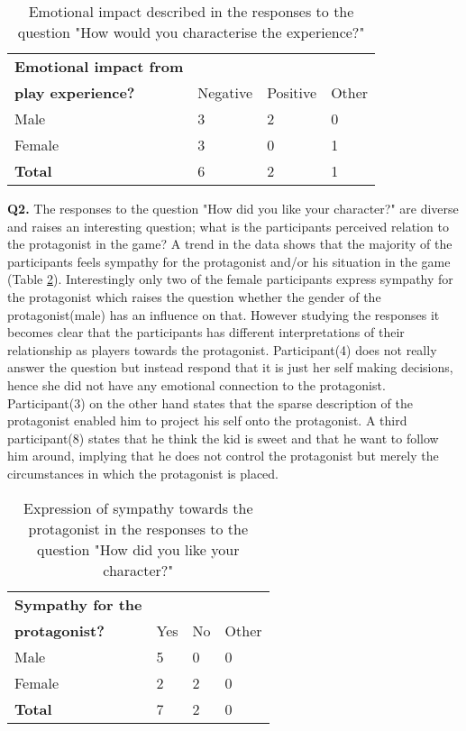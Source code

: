 \begin{table}[h]
\centering
\begin{tabular}{l l l l}
\hline
\textbf{Emotional impact from}\\
\textbf{play experience?} & Negative & Positive & Other \\
\hline
Male & 3 & 2 & 0 \\
Female & 3 & 0 & 1 \\
\textbf{Total} & 6 & 2 & 1 \\
\hline
\end{tabular}
\caption{\label{tab:emo}Emotional impact described in the responses to the question "How would you characterise the experience?"}
\end{table}

\textbf{Q2.} The responses to the question "How did you like your character?" are diverse and raises an interesting question; what is the participants perceived relation to the protagonist in the game? A trend in the data shows that the majority of the participants feels sympathy for the protagonist and/or his situation in the game (Table \ref{tab:symp}). Interestingly only two of the female participants express sympathy for the protagonist which raises the question whether the gender of the protagonist(male) has an influence on that. However studying the responses it becomes clear that the participants has different interpretations of their relationship as players towards the protagonist. Participant(4) does not really answer the question but instead respond that it is just her self making decisions, hence she did not have any emotional connection to the protagonist. Participant(3) on the other hand states that the sparse description of the protagonist enabled him to project his self onto the protagonist. A third participant(8) states that he think the kid is sweet and that he want to follow him around, implying that he does not control the protagonist but merely the circumstances in which the protagonist is placed.

\begin{table}[h]
\centering
\begin{tabular}{l l l l}
\hline
\textbf{Sympathy for the}\\
\textbf{protagonist?} & Yes & No & Other \\
\hline
Male & 5 & 0 & 0 \\
Female & 2 & 2 & 0 \\
\textbf{Total} & 7 & 2 & 0 \\
\hline
\end{tabular}
\caption{\label{tab:symp}Expression of sympathy towards the protagonist in the responses to the question "How did you like your character?"}
\end{table}

